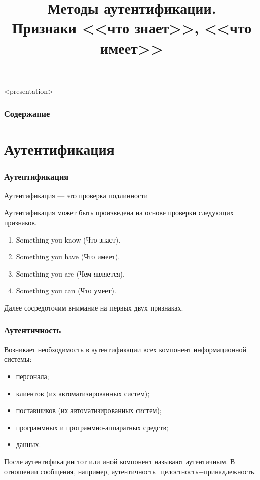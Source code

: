 
\title[Аутентификация: <<что знает>>, <<что имеет>>]{Методы аутентификации.\\ Признаки <<что знает>>, <<что имеет>>}

\newcommand{\Prv}{\textit{Д}}
\newcommand{\Ver}{\textit{П}}





\begin{frame}<presentation>
    \frametitle{Содержание}
    \tableofcontents
\end{frame}


\section{Аутентификация}


\begin{frame}
\frametitle{Аутентификация}
\begin{definition}%
\alert{Аутентификация} --- это проверка подлинности
\end{definition}
Аутентификация может быть произведена на основе проверки следующих признаков.
\begin{enumerate}
    \item \alert{Something you know (Что знает)}.
    \item \alert{Something you have (Что имеет)}.
    \item Something you are (Чем является).
    \item Something you can (Что умеет).
\end{enumerate}
Далее сосредоточим внимание на первых двух признаках.
\end{frame}


\begin{frame}
\frametitle{Аутентичность}
Возникает необходимость в аутентификации всех компонент информационной системы: 
\begin{itemize}
    \item персонала;
    \item клиентов (их автоматизированных систем);
    \item поставшиков (их автоматизированных систем);
    \item программных и программно-аппаратных средств;
    \item данных.
\end{itemize}
После аутентификации тот или иной компонент называют \alert{аутентичным}. В отношении сообщения, например, аутентичность=целостность+принадлежность.
\end{frame}


